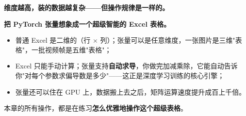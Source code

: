 \documentclass[a4paper,11pt]{ctexart}
\begin{document}
\textbf{维度越高，装的数据越复杂——但操作规律是一样的。}

\begin{metaphorbox}
    \textbf{把 PyTorch 张量想象成一个超级智能的 Excel 表格。}

    \begin{itemize}
        \item 普通 Excel 是二维的（行 $\times$ 列）；张量可以是任意维度，一张图片是三维"表格"，一批视频帧是五维"表格"；
        \item Excel 只能手动计算；张量支持\textbf{自动求导}，你做完加减乘除，它能自动告诉你"对每个参数求偏导数是多少"——这正是深度学习训练的核心引擎；
        \item 张量还可以住在 GPU 上，数据搬上去之后，矩阵运算速度提升成百上千倍。
    \end{itemize}

    本章的所有操作，都是在练习\textbf{怎么优雅地操作这个超级表格}。
\end{metaphorbox}
\end{document}
